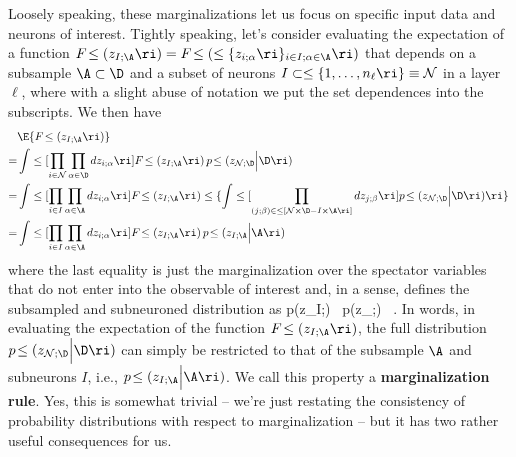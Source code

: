 Loosely speaking, these marginalizations let us focus on specific input data and neurons of interest. Tightly speaking, let's consider evaluating the expectation of a function $F\!\le(z_{I;\A}\ri)=F\!\le(\le\{z_{i;\alpha}\ri\}_{i\in I; \alpha\in\A}\ri)$ that depends on a subsample $\A\subset\D$ and a subset of neurons $I\subset\le\{1,\ldots,n_\ell\ri\}\equiv \mathcal{N}$ in a layer $\ell$, where with a slight abuse of notation we put the set dependences into the subscripts. We then have
\begin{align}\label{eq:marginalization-rule}
&\E{F\!\le(z_{I;\A}\ri)}\, \\
=&\int \le[\prod_{i\in \mathcal{N}}\prod_{\alpha\in\D} dz_{i;\alpha}\ri]F\!\le(z_{I;\A}\ri)\, p\!\le(z_{\mathcal{N};\D}\Big\vert\D\ri) \, \nonumber\\
=&\int \le[\prod_{i\in I}\prod_{\alpha\in\A} dz_{i;\alpha}\ri] F\!\le(z_{I;\A}\ri)\le\{\int \le[ \prod_{(j;\beta)\in\le[ \mathcal{N}\times\D-I\times\A\ri]}dz_{j;\beta}\ri] p\!\le(z_{\mathcal{N};\D}\Big\vert\D\ri)\ri\}\, \nonumber\\
=&\int \le[\prod_{i\in I}\prod_{\alpha\in\A} dz_{i;\alpha}\ri] F\!\le(z_{I;\A}\ri)\, p\!\le(z_{I;\A}\Big\vert\A\ri) \notag
\end{align}
where the last equality is just the marginalization over the spectator variables that do not enter into the observable of interest and, in a sense, defines the subsampled and subneuroned distribution as
\be\label{eq:sum-rule-mlp}
p\!\le(z_{I;\A}\Big\vert\A\ri) \equiv \int {}\ p\!\le(z_{;\D}\Big\vert\D\ri) \, .
\ee
In words, in evaluating the expectation of the function $F\!\le(z_{I;\A}\ri)$, the full distribution $p\!\le(z_{\mathcal{N};\D}\Big\vert\D\ri)$ can simply be restricted to that of the subsample $\A$ and subneurons $I$, i.e., $p\!\le(z_{I;\A}\Big\vert\A\ri)$.
We call this property a \textbf{marginalization rule}.
Yes, this is somewhat trivial -- we're just restating the consistency of probability distributions with respect to marginalization -- but it has two rather useful consequences for us.
 




